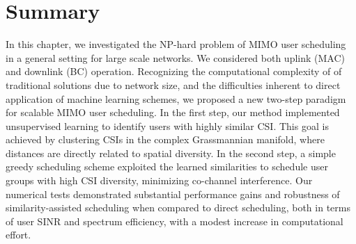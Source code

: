 \section{Summary}
In this chapter, we investigated the NP-hard problem of MIMO user scheduling in a general setting for large scale networks. We considered both uplink (MAC) and downlink (BC) operation. Recognizing the computational complexity of  of traditional solutions due to network size, and the difficulties inherent to direct application of machine learning schemes, we proposed a new two-step paradigm for scalable MIMO user scheduling. 
In the first step, our method implemented unsupervised learning to identify users with highly similar CSI. This goal is achieved by clustering CSIs in the complex Grassmannian manifold, where distances are directly related to spatial diversity. In the second step, a simple greedy scheduling scheme exploited the learned similarities to schedule user groups with high CSI diversity, minimizing co-channel interference. Our numerical tests demonstrated substantial performance gains and robustness of similarity-assisted scheduling when compared to direct scheduling, both in terms of user SINR and spectrum efficiency, with a modest increase in computational effort.